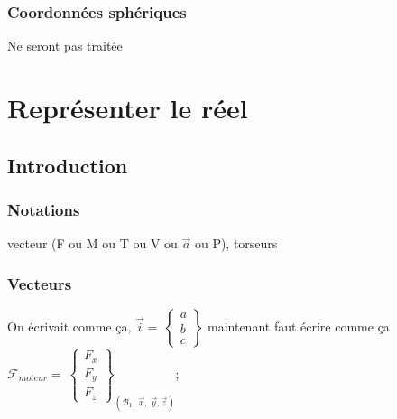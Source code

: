 \documentclass[
	11pt, %
	fleqn, %
	a4paper, %
]{LegrandOrangeBook}
\begin{document}
\subsection{Coordonnées sphériques}
Ne seront pas traitée








\chapterspaceabove{6.25cm} %
\chapterspacebelow{7.5cm} %

\chapter{Représenter le réel}

\section{Introduction}









\subsection{Notations}
vecteur (F ou M ou T ou V ou $\Vec{a}$ ou P), torseurs
\subsection{Vecteurs}\label{Vecteurs}

On écrivait comme ça,  $\Vec{i}=\ \begin{Bmatrix} a\\ b \\ c \end{Bmatrix} $  maintenant faut écrire comme ça 
 {$\mathcal{F}_{moteur} =\ \begin{Bmatrix}
F_{x}\\
F_{y}\\
F_{z}
\end{Bmatrix}_{( \mathcal{B}_{1} ,\ \vec{x} ,\ \vec{y} ,\vec{z})}$};
\end{document}
